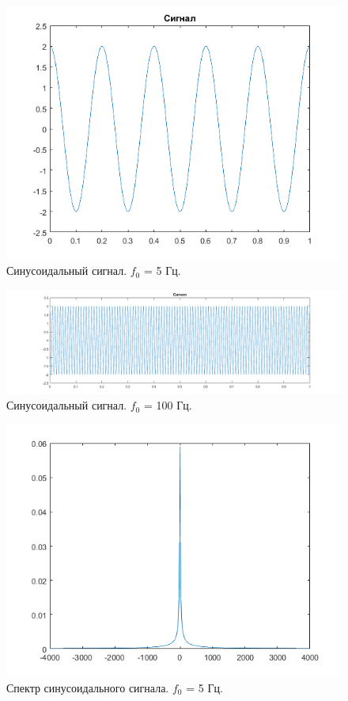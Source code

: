 \documentclass[a4paper,14pt]{extarticle}
\begin{document}
\begin{figure}[H]
\centering
\includegraphics[scale=0.75]{pics/1sin5Hz.png}
\caption{Синусоидальный сигнал. $f_0$ = 5 Гц.}
\label{sin5}
\end{figure}
\begin{figure}[H]
\centering
\includegraphics[scale=0.5]{pics/1sin100Hz.png}
\caption{Синусоидальный сигнал. $f_0$ = 100 Гц.}
\label{sin100}
\end{figure}
\begin{figure}[H]
\centering
\includegraphics[scale=0.75]{pics/1sin5Hz_spec.png}
\caption{Спектр синусоидального сигнала. $f_0$ = 5 Гц.}
\label{sin5_}
\end{figure}
\end{document}
